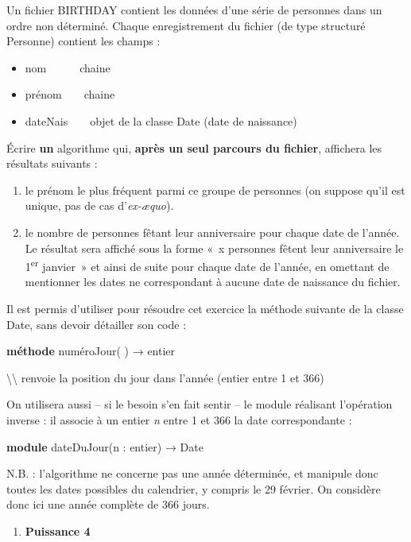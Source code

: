 \bigskip

{
Un fichier BIRTHDAY contient les données d’une série de personnes dans
un ordre non déterminé. Chaque enregistrement du fichier (de type
structuré Personne) contient les champs :}

\liststyleListi
\begin{itemize}
\item {
nom\ \ \ \ \ \ chaine}
\item {
prénom\ \ \ \ chaine}
\item {
dateNais\ \ \ \ objet de la classe Date (date de naissance)}
\end{itemize}
{
Écrire \textbf{un} algorithme qui, \textbf{après un seul parcours du
fichier}, affichera les résultats suivants :}

\liststyleNumberingi
\begin{enumerate}
\item {
le prénom le plus fréquent parmi ce groupe de personnes (on suppose
qu’il est unique, pas de cas d’\textit{ex-æquo}).}
\item {
le nombre de personnes fêtant leur anniversaire pour chaque date de
l’année. Le résultat sera affiché sous la forme «~x personnes fêtent
leur anniversaire le 1\textsuperscript{er} janvier~» et ainsi de suite
pour chaque date de l’année, en omettant de mentionner les dates ne
correspondant à aucune date de naissance du fichier.}
\end{enumerate}
{
Il est permis d’utiliser pour résoudre cet exercice la méthode suivante
de la classe Date, sans devoir détailler son code :}

{\sffamily
\textbf{méthode} numéroJour( ) → entier}

{\sffamily
{\textbackslash}{\textbackslash} renvoie la position du jour dans
l’année (entier entre 1 et 366)}

{
On utilisera aussi – si le besoin s’en fait sentir – le module réalisant
l’opération inverse : il associe à un entier \textit{n} entre 1 et 366
la date correspondante :}

{\sffamily
\textbf{module} dateDuJour(n : entier) → Date}

{
N.B. : l’algorithme ne concerne pas une année déterminée, et manipule
donc toutes les dates possibles du calendrier, y compris le 29 février.
On considère donc ici une année complète de 366 jours.}

\liststyleExercice
\begin{enumerate}
\item {\sffamily\bfseries
Puissance 4}
\end{enumerate}


